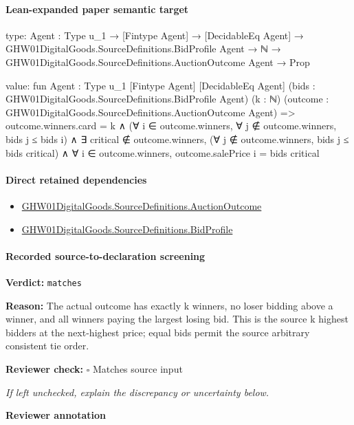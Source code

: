 \documentclass[10pt]{article}
\newcommand{\reviewerbox}{%
  \par\noindent\fbox{\parbox{0.96\linewidth}{\rule{0pt}{0.38in}}}\par
}
\newcommand{\reviewmatch}[1]{%
  \par\noindent\textbf{Reviewer check:} $\square$\; #1\par
  \noindent\emph{If left unchecked, explain the discrepancy or uncertainty below.}\par
}
\begin{document}
\paragraph{Lean-expanded paper semantic target}
\begin{ReviewVerbatim}
type:
{Agent : Type u_1} →
  [Fintype Agent] →
    [DecidableEq Agent] →
      GHW01DigitalGoods.SourceDefinitions.BidProfile Agent →
        ℕ → GHW01DigitalGoods.SourceDefinitions.AuctionOutcome Agent → Prop

value:
fun {Agent : Type u_1} [Fintype Agent] [DecidableEq Agent] (bids : GHW01DigitalGoods.SourceDefinitions.BidProfile Agent)
    (k : ℕ) (outcome : GHW01DigitalGoods.SourceDefinitions.AuctionOutcome Agent) =>
  outcome.winners.card = k ∧
    (∀ i ∈ outcome.winners, ∀ j ∉ outcome.winners, bids j ≤ bids i) ∧
      ∃ critical ∉ outcome.winners,
        (∀ j ∉ outcome.winners, bids j ≤ bids critical) ∧ ∀ i ∈ outcome.winners, outcome.salePrice i = bids critical
\end{ReviewVerbatim}

\paragraph{Direct retained dependencies}
\begin{itemize}\raggedright
\item \hyperlink{paper-prerequisite-fc173e8d557afd08}{GHW01\allowbreak{}Digital\allowbreak{}Goods.\allowbreak{}Source\allowbreak{}Definitions.\allowbreak{}Auction\allowbreak{}Outcome}
\item \hyperlink{paper-prerequisite-ac8769d0dccf04f4}{GHW01\allowbreak{}Digital\allowbreak{}Goods.\allowbreak{}Source\allowbreak{}Definitions.\allowbreak{}Bid\allowbreak{}Profile}
\end{itemize}
\paragraph{Recorded source-to-declaration screening}
\textbf{Verdict:} \texttt{matches}
\\
{\raggedright
\textbf{Reason:} The actual outcome has exactly k winners, no loser bidding above a winner, and all winners paying the largest losing bid.\allowbreak{} This is the source k highest bidders at the next-\allowbreak{}highest price;\allowbreak{} equal bids permit the source arbitrary consistent tie order.\allowbreak{}
\par}
\reviewmatch{Matches source input}
\noindent\textbf{Reviewer annotation}\par
\reviewerbox
\clearpage
\hypertarget{paper-prerequisite-dfe7086198eadcdb}{}
\end{document}
